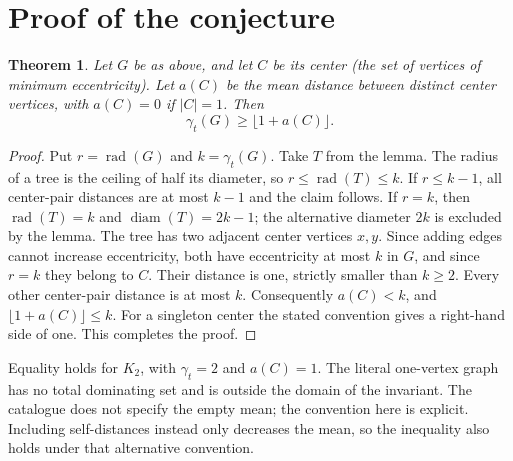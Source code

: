 \documentclass[11pt]{article}
\newtheorem{theorem}{Theorem}
\begin{document}
\section{Proof of the conjecture}
\begin{theorem}
Let $G$ be as above, and let $C$ be its center (the set of vertices of minimum eccentricity). Let $a(C)$ be the mean distance between distinct center vertices, with $a(C)=0$ if $|C|=1$. Then
\[
 \gamma_t(G)\ge \lfloor 1+a(C)\rfloor .
\]
\end{theorem}
\begin{proof}
Put $r=\operatorname{rad}(G)$ and $k=\gamma_t(G)$. Take $T$ from the lemma. The radius of a tree is the ceiling of half its diameter, so $r\le\operatorname{rad}(T)\le k$. If $r\le k-1$, all center-pair distances are at most $k-1$ and the claim follows. If $r=k$, then $\operatorname{rad}(T)=k$ and $\operatorname{diam}(T)=2k-1$; the alternative diameter $2k$ is excluded by the lemma. The tree has two adjacent center vertices $x,y$. Since adding edges cannot increase eccentricity, both have eccentricity at most $k$ in $G$, and since $r=k$ they belong to $C$. Their distance is one, strictly smaller than $k\ge2$. Every other center-pair distance is at most $k$. Consequently $a(C)<k$, and $\lfloor 1+a(C)\rfloor\le k$. For a singleton center the stated convention gives a right-hand side of one. This completes the proof.
\end{proof}
Equality holds for $K_2$, with $\gamma_t=2$ and $a(C)=1$. The literal one-vertex graph has no total dominating set and is outside the domain of the invariant. The catalogue does not specify the empty mean; the convention here is explicit. Including self-distances instead only decreases the mean, so the inequality also holds under that alternative convention.
\end{document}
